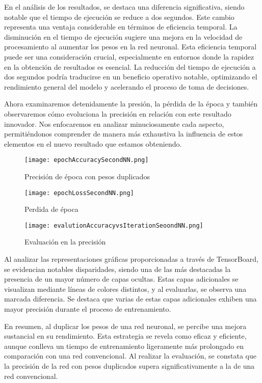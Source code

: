   En el análisis de los resultados, se destaca una diferencia significativa, siendo notable que el tiempo de ejecución se reduce a dos segundos. Este cambio representa una ventaja considerable en términos de eficiencia temporal. La disminución en el tiempo de ejecución sugiere una mejora en la velocidad de procesamiento al aumentar los pesos en la red neuronal. Esta eficiencia temporal puede ser una consideración crucial, especialmente en entornos donde la rapidez en la obtención de resultados es esencial. La reducción del tiempo de ejecución a dos segundos podría traducirse en un beneficio operativo notable, optimizando el rendimiento general del modelo y acelerando el proceso de toma de decisiones.  

  Ahora examinaremos detenidamente la presión, la pérdida de la época y también observaremos cómo evoluciona la precisión en relación con este resultado innovador. Nos enfocaremos en analizar minuciosamente cada aspecto, permitiéndonos comprender de manera más exhaustiva la influencia de estos elementos en el nuevo resultado que estamos obteniendo.

  \begin{figure}[H]
    \centering
    \texttt{[image: epochAccuracySecondNN.png]}
    \caption{Precisión de época con pesos duplicados}
    \label{fig: epochAccuracySecondNN}
  \end{figure}

  \begin{figure}[H]
    \centering
    \texttt{[image: epochLossSecondNN.png]}
    \caption{Perdida de época}
    \label{fig: epochLossSecondNN}
  \end{figure}

  \begin{figure}[H]
    \centering
    \texttt{[image: evalutionAccuracyvsIterationSeoondNN.png]}
    \caption{Evaluación en la precisión}
    \label{fig: evalutionAccuracyvsIterationSeoondNN}
  \end{figure}

  Al analizar las representaciones gráficas proporcionadas a través de TensorBoard, se evidencian notables disparidades, siendo una de las más destacadas la presencia de un mayor número de capas ocultas. Estas capas adicionales se visualizan mediante líneas de colores distintos, y al evaluarlas, se observa una marcada diferencia. Se destaca que varias de estas capas adicionales exhiben una mayor precisión durante el proceso de entrenamiento.

  En resumen, al duplicar los pesos de una red neuronal, se percibe una mejora sustancial en su rendimiento. Esta estrategia se revela como eficaz y eficiente, aunque conlleva un tiempo de entrenamiento ligeramente más prolongado en comparación con una red convencional. Al realizar la evaluación, se constata que la precisión de la red con pesos duplicados supera significativamente a la de una red convencional.